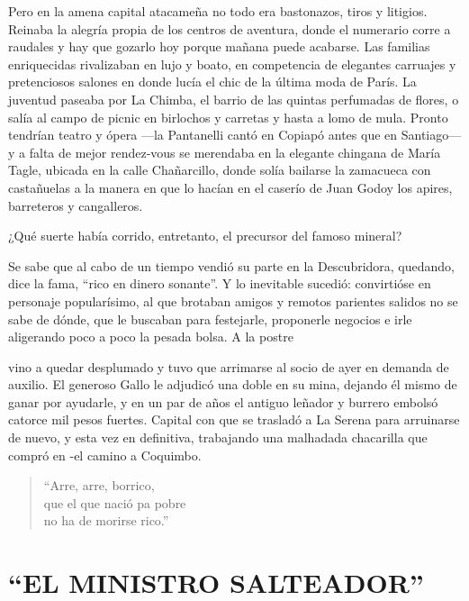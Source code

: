 \documentclass[10pt,twoside,openright]{memoir}
\begin{document}
Pero en la amena capital atacameña no todo era bastonazos, tiros y
litigios. Reinaba la alegría propia de los centros de aventura, donde el
numerario corre a raudales y hay que gozarlo hoy porque mañana puede
acabarse. Las familias enriquecidas rivalizaban en lujo y boato, en
competencia de elegantes carruajes y pretenciosos salones en donde lucía
el chic de la última moda de París. La juventud paseaba por La Chimba,
el barrio de las quintas perfumadas de flores, o salía al campo de
picnic en birlochos y carretas y hasta a lomo de mula. Pronto tendrían
teatro y ópera ---la Pantanelli cantó en Copiapó antes que en
Santiago--- y a falta de mejor rendez-vous se merendaba en la elegante
chingana de María Tagle, ubicada en la calle Chañarcillo, donde solía
bailarse la zamacueca con castañuelas a la manera en que lo hacían en el
caserío de Juan Godoy los apires, barreteros y cangalleros.

¿Qué suerte había corrido, entretanto, el precursor del famoso mineral?

Se sabe que al cabo de un tiempo vendió su parte en la Descubridora,
quedando, dice la fama, ``rico en dinero sonante''. Y lo inevitable
sucedió: convirtióse en personaje popularísimo, al que brotaban amigos y
remotos parientes salidos no se sabe de dónde, que le buscaban para
festejarle, proponerle negocios e irle aligerando poco a poco la pesada
bolsa. A la postre

vino a quedar desplumado y tuvo que arrimarse al socio de ayer en
demanda de auxilio. El generoso Gallo le adjudicó una doble en su mina,
dejando él mismo de ganar por ayudarle, y en un par de años el antiguo
leñador y burrero embolsó catorce mil pesos fuertes. Capital con que se
trasladó a La Serena para arruinarse de nuevo, y esta vez en definitiva,
trabajando una malhadada chacarilla que compró en -el camino a Coquimbo.

\begin{verse}
``Arre, arre, borrico,\\
que el que nació pa pobre\\
no ha de morirse rico.''
\end{verse}

\chapter{``EL MINISTRO SALTEADOR''}
\end{document}
